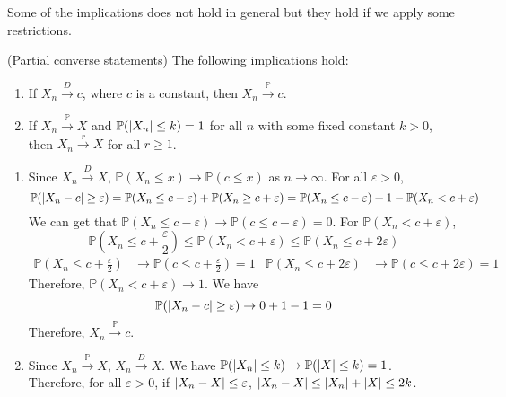 \documentclass{huhtakm-template-book}
\newcommand{\prob}{\mathbb{P}}
\begin{document}
Some of the implications does not hold in general but they hold if we apply some restrictions.
\begin{thm}(Partial converse statements)
	\label{Chapter 7 (Theorem) Partial converse statements}
	The following implications hold:
	\begin{enumerate}
		\item If $X_{n}\xrightarrow{D}c$, where $c$ is a constant, then $X_{n}\xrightarrow{\prob}c$.
		\item If $X_{n}\xrightarrow{\prob}X$ and $\prob(\abs{X_{n}}\leq k)=1$ for all $n$ with some fixed constant $k>0$, then $X_{n}\xrightarrow{r}X$ for all $r\geq 1$.
	\end{enumerate}
\end{thm}
\begin{proofing}
	\begin{enumerate}
		\item Since $X_{n}\xrightarrow{D}X$, $\prob(X_{n}\leq x)\to\prob(c\leq x)$ as $n\to\infty$. For all $\varepsilon>0$,
		\begin{equation*}
			\prob(\abs{X_{n}-c}\geq\varepsilon)=\prob(X_{n}\leq c-\varepsilon)+\prob(X_{n}\geq c+\varepsilon)=\prob(X_{n}\leq c-\varepsilon)+1-\prob(X_{n}<c+\varepsilon)
		\end{equation*}
		We can get that $\prob(X_{n}\leq c-\varepsilon)\to\prob(c\leq c-\varepsilon)=0$. For $\prob(X_{n}<c+\varepsilon)$,
		\begin{equation*}
			\prob\left(X_{n}\leq c+\frac{\varepsilon}{2}\right)\leq\prob(X_{n}<c+\varepsilon)\leq\prob(X_{n}\leq c+2\varepsilon)
		\end{equation*}
		\begin{align*}
			\prob\left(X_{n}\leq c+\frac{\varepsilon}{2}\right)&\to\prob\left(c\leq c+\frac{\varepsilon}{2}\right)=1 & \prob(X_{n}\leq c+2\varepsilon)&\to\prob(c\leq c+2\varepsilon)=1
		\end{align*}
		Therefore, $\prob(X_{n}<c+\varepsilon)\to 1$. We have
		\begin{equation*}
			\prob(\abs{X_{n}-c}\geq\varepsilon)\to 0+1-1 = 0
		\end{equation*}
		Therefore, $X_{n}\xrightarrow{\prob}c$.
		\item Since $X_{n}\xrightarrow{\prob}X$, $X_{n}\xrightarrow{D}X$. We have $\prob(\abs{X_{n}}\leq k)\to\prob(\abs{X}\leq k)=1$.\\
		Therefore, for all $\varepsilon>0$, if $\left|{X_{n}-X}\right|\leq\varepsilon$, $\left|{X_{n}-X}\right|\leq\left|{X_{n}}\right|+\left|{X}\right|\leq 2k$.
		\begin{align*}

\end{align*}
\end{enumerate}
\end{proofing}
\end{document}

